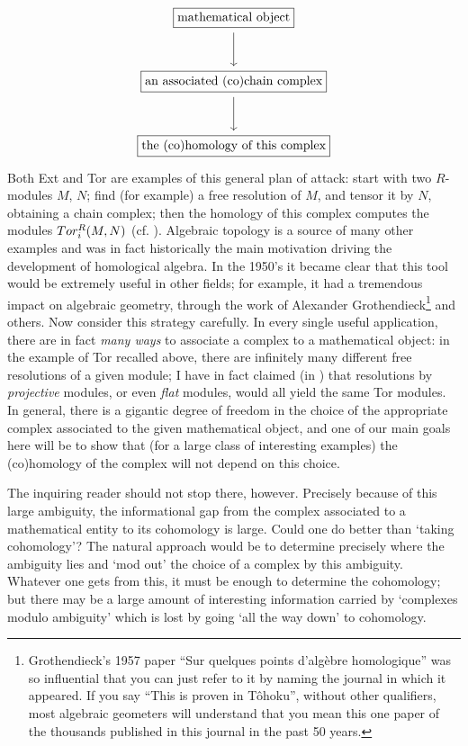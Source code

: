 \[\begin{tikzcd}[row sep=large]
    \boxed{\text{mathematical object}} \arrow[d] \\
    \boxed{\text{an associated (co)chain complex}} \arrow[d] \\
    \boxed{\text{the (co)homology of this complex}}
  \end{tikzcd}\] Both Ext and Tor are examples of this general plan of
attack: start with two $R$-modules $M$, $N$; find (for example) a free
resolution of $M$, and tensor it by $N$, obtaining a chain complex;
then the homology of this complex computes the modules
$Tor^R_i(M, N)$
(cf. ). Algebraic topology is
a source of many other examples and was in fact historically the main
motivation driving the development of homological algebra. In the
1950's it became clear that this tool would be extremely useful in
other fields; for example, it had a tremendous impact on algebraic
geometry, through the work of Alexander
Grothendieck\footnote{Grothendieck's 1957 paper ``Sur quelques points
  d'alg\`ebre homologique'' was so influential that you can just refer
  to it by naming the journal in which it appeared. If you say ``This
  is proven in T\^ohoku'', without other qualifiers, most algebraic
  geometers will understand that you mean this one paper of the
  thousands published in this journal in the past 50 years.} and
others.  Now consider this strategy carefully. In every single useful
application, there are in fact \emph{many ways} to associate a complex
to a mathematical object: in the example of Tor recalled above, there
are infinitely many different free resolutions of a given module; I
have in fact claimed (in )
that resolutions by \emph{projective} modules, or even \emph{flat}
modules, would all yield the same Tor modules. In general, there is a
gigantic degree of freedom in the choice of the appropriate complex
associated to the given mathematical object, and one of our main goals
here will be to show that (for a large class of interesting examples)
the (co)homology of the complex will not depend on this choice.

The inquiring reader should not stop there, however. Precisely because
of this large ambiguity, the informational gap from the complex
associated to a mathematical entity to its cohomology is large. Could
one do better than `taking cohomology'? The natural approach would be
to determine precisely where the ambiguity lies and `mod out' the
choice of a complex by this ambiguity. Whatever one gets from this, it
must be enough to determine the cohomology; but there may be a large
amount of interesting information carried by `complexes modulo
ambiguity' which is lost by going `all the way down' to cohomology.

